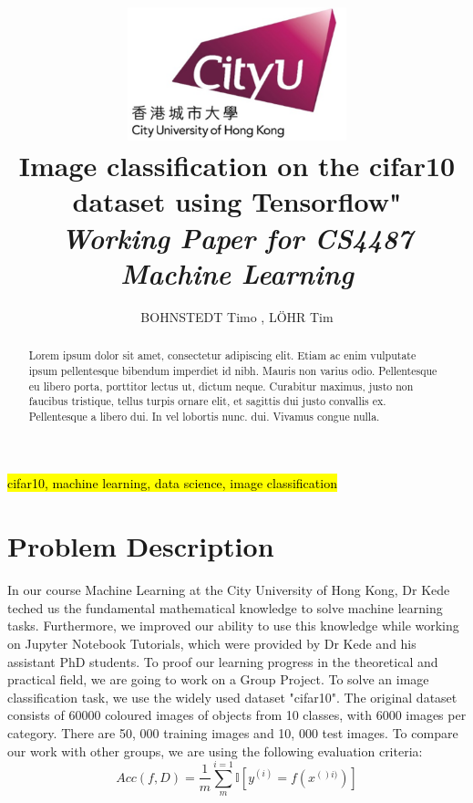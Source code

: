 \documentclass[journal]{IEEEtran}
\begin{document}
    \title{\includegraphics[width=2.5in]{photo/0_cityu} \\
    Image  classification on the cifar10 dataset using Tensorflow"\\
     \textit{Working Paper for CS4487 Machine Learning}
     }
  \author{BOHNSTEDT 	Timo ,
      L\"OHR Tim\\ 
}

\maketitle
\begin{abstract}
Lorem ipsum dolor sit amet, consectetur adipiscing elit. Etiam ac enim vulputate ipsum pellentesque bibendum imperdiet id nibh. Mauris non varius odio. Pellentesque eu libero porta, porttitor lectus ut, dictum neque. Curabitur maximus, justo non faucibus tristique, tellus turpis ornare elit, et sagittis dui justo convallis ex. Pellentesque a libero dui. In vel lobortis nunc. dui. Vivamus congue nulla.
\end{abstract}

\begin{IEEEkeywords}
\hl{cifar10, machine learning, data science, image classification}
\end{IEEEkeywords}

\IEEEpeerreviewmaketitle

\section{Problem Description}
In our course Machine Learning at the City University of Hong Kong, Dr Kede teched us the fundamental mathematical knowledge to solve machine learning tasks. Furthermore, we improved our ability to use this knowledge while working on Jupyter Notebook Tutorials, which were provided by Dr Kede and his assistant PhD students. To proof our learning progress in the theoretical and practical field, we are going to work on a Group Project. To solve an image classification task, we use the widely used dataset "cifar10". The original dataset consists of 60000 coloured images of objects from 10 classes, with 6000 images per category. There are 50, 000 training images and 10, 000 test images. To compare our work with other groups, we are using the following evaluation criteria:
\begin{equation}
Acc(f,D) = \frac{1}{m}\sum_{m}^{i=1} \mathbb{I} \left [ y^{(i)} =f(x^{()i)})\right ]
\label{acc}
\end{equation}
\end{document}
